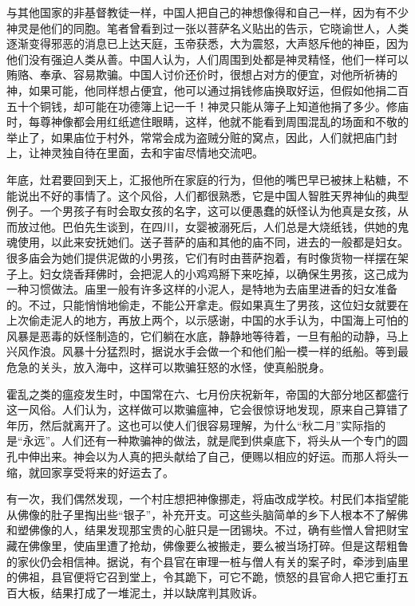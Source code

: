 \documentclass[12pt,oneside]{book}
\begin{document}
\begin{common-format}
与其他国家的非基督教徒一样，中国人把自己的神想像得和自己一样，因为有不少神灵是他们的同胞。笔者曾看到过一张以菩萨名义贴出的告示，它晓谕世人，人类逐渐变得邪恶的消息已上达天庭，玉帝获悉，大为震怒，大声怒斥他的神臣，因为他们没有强迫人类从善。中国人认为，人们周围到处都是神灵精怪，他们一样可以贿赂、奉承、容易欺骗。中国人讨价还价时，很想占对方的便宜，对他所祈祷的神，如果可能，他同样想占便宜，他可以通过捐钱修庙换取好运，但假如他捐二百五十个铜钱，却可能在功德簿上记一千！神灵只能从簿子上知道他捐了多少。修庙时，每尊神像都会用红纸遮住眼睛，这样，他就不能看到周围混乱的场面和不敬的举止了，如果庙位于村外，常常会成为盗贼分赃的窝点，因此，人们就把庙门封上，让神灵独自待在里面，去和宇宙尽情地交流吧。 

年底，灶君要回到天上，汇报他所在家庭的行为，但他的嘴巴早已被抹上粘糖，不能说出不好的事情了。这个风俗，人们都很熟悉，它是中国人智胜天界神仙的典型例子。一个男孩子有时会取女孩的名字，这可以便愚蠢的妖怪认为他真是女孩，从而放过他。巴伯先生谈到，在四川，女婴被溺死后，人们总是大烧纸钱，供她的鬼魂使用，以此来安抚她们。送子菩萨的庙和其他的庙不同，进去的一般都是妇女。很多庙会为她们提供泥做的小男孩，它们有时由菩萨抱着，有时像货物一样摆在架子上。妇女烧香拜佛时，会把泥人的小鸡鸡掰下来吃掉，以确保生男孩，这己成为一种习惯做法。庙里一般有许多这样的小泥人，是特地为去庙里进香的妇女准备的。不过，只能悄悄地偷走，不能公开拿走。假如果真生了男孩，这位妇女就要在上次偷走泥人的地方，再放上两个，以示感谢，中国的水手认为，中国海上可怕的风暴是恶毒的妖怪制造的，它们躺在水底，静静地等待着，一旦有船的动静，马上兴风作浪。风暴十分猛烈时，据说水手会做一个和他们船一模一样的纸船。等到最危急的关头，放入海中，这样可以欺骗狂怒的水怪，使真船脱身。 

霍乱之类的瘟疫发生时，中国常在六、七月份庆祝新年，帝国的大部分地区都盛行这一风俗。人们认为，这样做可以欺骗瘟神，它会很惊讶地发现，原来自己算错了年历，然后就离开了。这也可以使人们很容易理解，为什么“秋二月”实际指的是“永远”。人们还有一种欺骗神的做法，就是爬到供桌底下，将头从一个专门的圆孔中伸出来。神会以为人真的把头献给了自己，便赐以相应的好运。而那人将头一缩，就回家享受将来的好运去了。 

有一次，我们偶然发现，一个村庄想把神像挪走，将庙改成学校。村民们本指望能从佛像的肚子里掏出些“银子”，补充开支。可这些头脑简单的乡下人根本不了解佛和塑佛像的人，结果发现那宝贵的心脏只是一团锡块。不过，确有些憎人曾把财宝藏在佛像里，使庙里遭了抢劫，佛像要么被搬走，要么被当场打碎。但是这帮粗鲁的家伙仍会相信神。据说，有个县官在审理一桩与僧人有关的案子时，牵涉到庙里的佛祖，县官便将它召到堂上，令其跪下，可它不跪，愤怒的县官命人把它重打五百大板，结果打成了一堆泥土，并以缺席判其败诉。 


\end{common-format}
\end{document}
